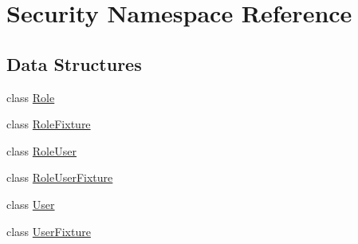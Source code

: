 \hypertarget{namespace_security}{\section{Security Namespace Reference}
\label{namespace_security}
}
\subsection*{Data Structures}
\begin{DoxyCompactItemize}
\item 
class \hyperlink{class_security_1_1_role}{Role}
\item 
class \hyperlink{class_security_1_1_role_fixture}{Role\-Fixture}
\item 
class \hyperlink{class_security_1_1_role_user}{Role\-User}
\item 
class \hyperlink{class_security_1_1_role_user_fixture}{Role\-User\-Fixture}
\item 
class \hyperlink{class_security_1_1_user}{User}
\item 
class \hyperlink{class_security_1_1_user_fixture}{User\-Fixture}
\end{DoxyCompactItemize}
